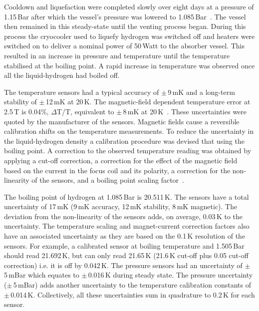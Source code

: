 Cooldown and liquefaction were completed slowly over eight days at a
pressure of 1.15\,Bar after which the vessel's pressure was lowered to
1.085\,Bar~\cite{1748-0221-13-09-T09008}.
The vessel then remained in this steady-state until the
venting process began.
During this process the cryocooler used to liquefy hydrogen was
switched off and heaters were switched on to deliver a nominal power
of 50\,Watt to the absorber vessel.
This resulted in an increase in pressure and temperature until the
temperature stabilised at the boiling point.
A rapid increase in temperature was observed once all the
liquid-hydrogen had boiled off. 

The temperature sensors had a typical accuracy of
$\mathrm{\pm}$\,9\,mK and a long-term stability of
$\mathrm{\pm}$\,12\,mK at 20\,K.
The magnetic-field dependent temperature error at 2.5\,T is 0.04\%,
$\Delta$T/T, equivalent to $\mathrm{\pm}$\,8\,mK at
20\,K~\cite{CernoxRTDs}\cite{TemperatureMeasurement}.
These uncertainties were quoted by the manufacturer of the sensors.
Magnetic fields cause a reversible calibration shifts on the temperature
measurements.
To reduce the uncertainty in the liquid-hydrogen density a calibration
procedure was devised that using the boiling point.
A correction to the observed temperature reading was obtained by
applying a cut-off correction, a correction for the effect of the
magnetic field based on the current in the focus coil and its
polarity, a correction for the non-linearity of the sensors, and a 
boiling point scaling factor~\cite{NOTE524}.  
 
The boiling point of hydrogen at 1.085\,Bar is 20.511\,K.
The sensors have a total uncertainty of 17\,mK (9\,mK accuracy, 12\,mK
stability, 8\,mK magnetic).
The deviation from the non-linearity of the sensors adds, on average,
0.03\,K to the uncertainty.
The temperature scaling and magnet-current correction factors also
have an associated uncertainty as they are based on the 0.1\,K
resolution of the sensors.  
For example, a calibrated sensor at boiling temperature and 1.505\,Bar
should read 21.692\,K, but can only read 21.65\,K (21.6\,K cut-off
plus 0.05 cut-off correction) i.e. it is off by 0.042\,K.
The pressure sensors had an uncertainty of $\mathrm{\pm}$\,5\,mBar
which equates to $\mathrm{\pm}$\,0.016\,K during steady state.
The pressure uncertainty ($\mathrm{\pm}$\,5\,mBar) adds another
uncertainty to the temperature calibration constants of
$\mathrm{\pm}$\,0.014\,K.
Collectively, all these uncertainties sum in quadrature to 0.2\,K for
each sensor.
 
